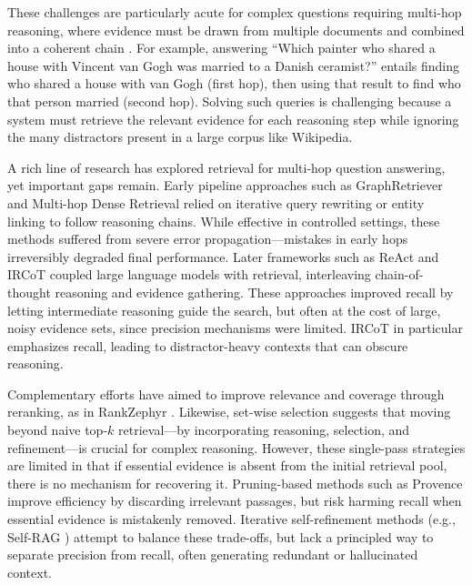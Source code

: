 \documentclass{article} %
\begin{document}
These challenges are particularly acute for complex questions requiring multi-hop reasoning, where evidence must be drawn from multiple documents and combined into a coherent chain \citep{yang2018hotpotqa, ho2020constructing, trivedi2022musique}. For example, answering “Which painter who shared a house with Vincent van Gogh was married to a Danish ceramist?” entails finding who shared a house with van Gogh (first hop), then using that result to find who that person married (second hop). Solving such queries is challenging because a system must retrieve the relevant evidence for each reasoning step while ignoring the many distractors present in a large corpus like Wikipedia.


A rich line of research has explored retrieval for multi-hop question answering, yet important gaps remain. Early pipeline approaches such as GraphRetriever and Multi-hop Dense Retrieval \citep{asai2020learning, xiong2021multihop, qi2019answering} relied on iterative query rewriting or entity linking to follow reasoning chains. While effective in controlled settings, these methods suffered from severe error propagation---mistakes in early hops irreversibly degraded final performance. Later frameworks such as ReAct \citep{yao2023react} and IRCoT \citep{trivedi-etal-2023-interleaving} coupled large language models with retrieval, interleaving chain-of-thought \citep{wei2022chain} reasoning and evidence gathering. These approaches improved recall by letting intermediate reasoning guide the search, but often at the cost of large, noisy evidence sets, since precision mechanisms were limited. IRCoT in particular emphasizes recall, leading to distractor-heavy contexts that can obscure reasoning.  

Complementary efforts have aimed to improve relevance and coverage through reranking, as in RankZephyr \citep{pradeep2023rankzephyr}. Likewise, set-wise selection \citep{lee-etal-2025-shifting} suggests that moving beyond naive top-$k$ retrieval---by incorporating reasoning, selection, and refinement---is crucial for complex reasoning. However, these single-pass strategies are limited in that if essential evidence is absent from the initial retrieval pool, there is no mechanism for recovering it. Pruning-based methods such as Provence \citep{chirkova2025provence} improve efficiency by discarding irrelevant passages, but risk harming recall when essential evidence is mistakenly removed. Iterative self-refinement methods (e.g., Self-RAG \citep{asai2023selfrag}) attempt to balance these trade-offs, but lack a principled way to separate precision from recall, often generating redundant or hallucinated context.  
\end{document}
